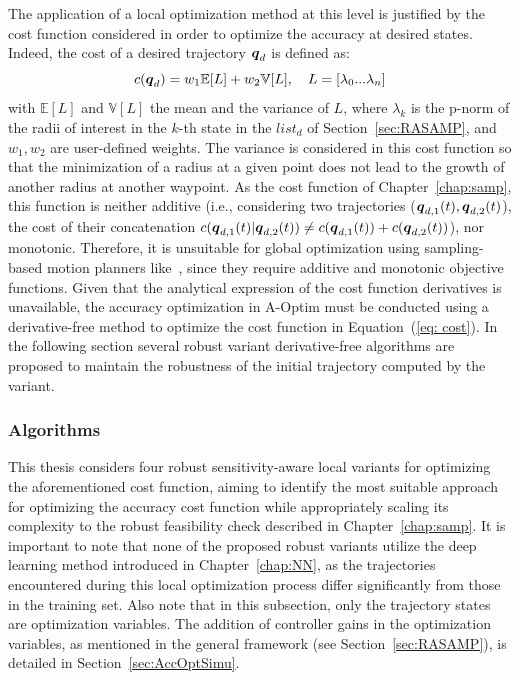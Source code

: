 The application of a local optimization method at this level is justified by the cost function considered in order to optimize the accuracy at desired states. 
Indeed, the cost of a desired trajectory $\boldsymbol{q}_d$ is defined as:
\begin{equation}\label{eq: cost}
    c(\boldsymbol{q}_d) = w_1\mathbb{E}[L] + w_2\mathbb{V}[L], \quad L = \left[\lambda_{0} ... \lambda_n \right]
\end{equation}
with $\mathbb{E}[L]$ and $\mathbb{V}[L]$ the mean and the variance of $L$, where $\lambda_k$ is the p-norm of the radii of interest in the $k$-th state in the $list_{d}$ of Section~\ref{sec:RASAMP}, and $w_1, w_2$ are user-defined weights.
The variance is considered in this cost function so that the minimization of a radius at a given point does not lead to the growth of another radius at another waypoint.
As the cost function of Chapter~\ref{chap:samp}, this function is neither additive (i.e., considering two trajectories ($\boldsymbol{q}_{d,1}(t), \boldsymbol{q}_{d,2}(t)$), the cost of their concatenation $c(\boldsymbol{q}_{d,1}(t)|\boldsymbol{q}_{d,2}(t)) \neq c(\boldsymbol{q}_{d,1}(t)) + c(\boldsymbol{q}_{d,2}(t))$), nor monotonic. 
Therefore, it is unsuitable for global optimization using sampling-based motion planners like~\cite{cRRT,cRRTstar}, since they require additive and monotonic objective functions.
Given that the analytical expression of the cost function derivatives is unavailable, the accuracy optimization in A-Optim must be conducted using a derivative-free method to optimize the cost function in Equation~(\ref{eq: cost}).
In the following section several robust variant derivative-free algorithms are proposed to maintain the robustness of the initial trajectory computed by the  variant.

\subsubsection{Algorithms}

This thesis considers four robust sensitivity-aware local variants for optimizing the aforementioned cost function, aiming to identify the most suitable approach for optimizing the accuracy cost function while appropriately scaling its complexity to the robust feasibility check described in Chapter~\ref{chap:samp}. 
It is important to note that none of the proposed robust variants utilize the deep learning method introduced in Chapter~\ref{chap:NN}, as the trajectories encountered during this local optimization process differ significantly from those in the training set.
Also note that in this subsection, only the trajectory states are optimization variables. 
The addition of controller gains in the optimization variables, as mentioned in the general framework (see Section~\ref{sec:RASAMP}), is detailed in Section~\ref{sec:AccOptSimu}.

